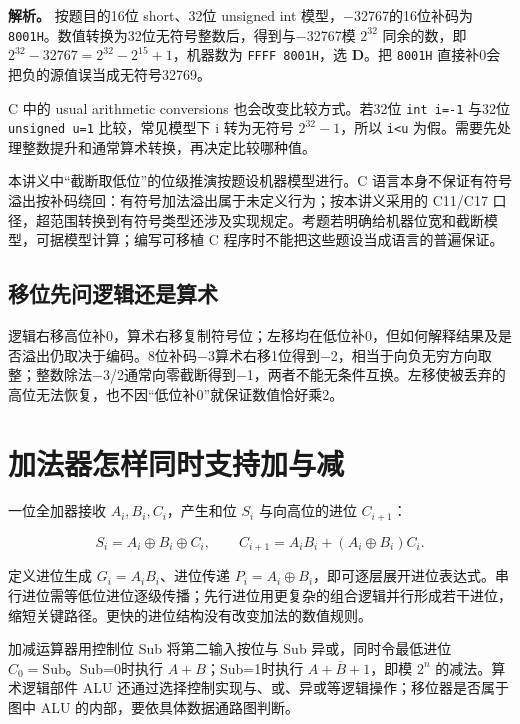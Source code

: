 
\textbf{解析。} 按题目的16位 short、32位 unsigned int 模型，−32767的16位补码为 \texttt{8001H}。数值转换为32位无符号整数后，得到与−32767模 \(2^{32}\) 同余的数，即 \(2^{32}-32767=2^{32}-2^{15}+1\)，机器数为 \texttt{FFFF\ 8001H}，选 \textbf{D}。把 \texttt{8001H} 直接补0会把负的源值误当成无符号32769。

C 中的 usual arithmetic conversions 也会改变比较方式。若32位 \texttt{int\ i=-1} 与32位 \texttt{unsigned\ u=1} 比较，常见模型下 i 转为无符号 \(2^{32}-1\)，所以 \texttt{i\textless{}u} 为假。需要先处理整数提升和通常算术转换，再决定比较哪种值。

本讲义中``截断取低位''的位级推演按题设机器模型进行。C 语言本身不保证有符号溢出按补码绕回：有符号加法溢出属于未定义行为；按本讲义采用的 C11/C17 口径，超范围转换到有符号类型还涉及实现规定。考题若明确给机器位宽和截断模型，可据模型计算；编写可移植 C 程序时不能把这些题设当成语言的普遍保证。

\subsection{移位先问逻辑还是算术}\label{co-c02-h78}

逻辑右移高位补0，算术右移复制符号位；左移均在低位补0，但如何解释结果及是否溢出仍取决于编码。8位补码−3算术右移1位得到−2，相当于向负无穷方向取整；整数除法−3/2通常向零截断得到−1，两者不能无条件互换。左移使被丢弃的高位无法恢复，也不因``低位补0''就保证数值恰好乘2。

\section{加法器怎样同时支持加与减}\label{co-02-04}

一位全加器接收 \(A_i,B_i,C_i\)，产生和位 \(S_i\) 与向高位的进位 \(C_{i+1}\)：

\[
S_i=A_i\oplus B_i\oplus C_i,
\qquad C_{i+1}=A_iB_i+(A_i\oplus B_i)C_i.
\]

定义进位生成 \(G_i=A_iB_i\)、进位传递 \(P_i=A_i\oplus B_i\)，即可逐层展开进位表达式。串行进位需等低位进位逐级传播；先行进位用更复杂的组合逻辑并行形成若干进位，缩短关键路径。更快的进位结构没有改变加法的数值规则。

加减运算器用控制位 Sub 将第二输入按位与 Sub 异或，同时令最低进位 \(C_0=\mathrm{Sub}\)。Sub=0时执行 \(A+B\)；Sub=1时执行 \(A+\overline B+1\)，即模 \(2^n\) 的减法。算术逻辑部件 ALU 还通过选择控制实现与、或、异或等逻辑操作；移位器是否属于图中 ALU 的内部，要依具体数据通路图判断。

